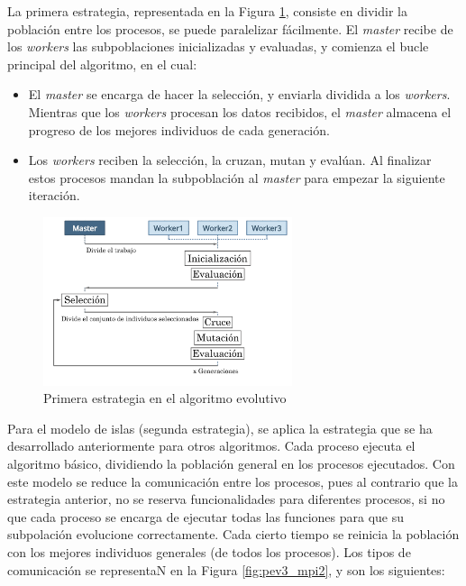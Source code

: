 	La primera estrategia, representada en la Figura \ref{fig:pev_mpi1}, consiste en dividir la población entre los procesos, se puede paralelizar fácilmente. El \textit{master} recibe de los \textit{workers} las subpoblaciones inicializadas y evaluadas, y comienza el bucle principal del algoritmo, en el cual:
	\begin{itemize}
		\item El \textit{master} se encarga de hacer la selección, y enviarla dividida a los \textit{workers}. Mientras que los \textit{workers} procesan los datos recibidos, el \textit{master} almacena el progreso de los mejores individuos de cada generación.
		\item Los \textit{workers} reciben la selección, la cruzan, mutan y evalúan. Al finalizar estos procesos mandan la subpoblación al \textit{master} para empezar la siguiente iteración.
	\end{itemize}
	
	\begin{figure}[!h]
		\centering
		\includegraphics[width=0.65\textwidth]{images/chapter_3/pev_mpi1}
		\caption{Primera estrategia en el algoritmo evolutivo}
		\label{fig:pev_mpi1}
	\end{figure}
	
	Para el modelo de islas (segunda estrategia), se aplica la estrategia que se ha desarrollado anteriormente para otros algoritmos. Cada proceso ejecuta el algoritmo básico, dividiendo la población general en los procesos ejecutados. Con este modelo se reduce la comunicación entre los procesos, pues al contrario que la estrategia anterior, no se reserva funcionalidades para diferentes procesos, si no que cada proceso se encarga de ejecutar todas las funciones para que su subpolación evolucione correctamente. Cada cierto tiempo se reinicia la población con los mejores individuos generales (de todos los procesos). Los tipos de comunicación se representaN en la Figura \ref{fig:pev3_mpi2}, y son los siguientes: 

